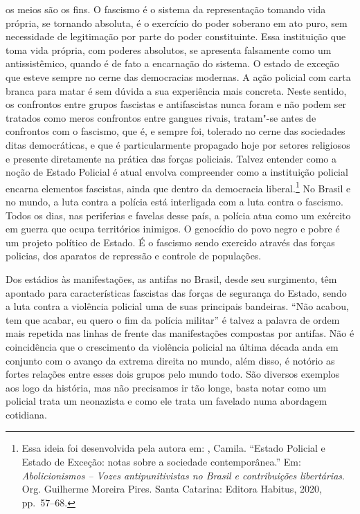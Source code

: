 os meios são os fins. O fascismo é o sistema da representação
tomando vida própria, se tornando absoluta, é o exercício do poder
soberano em ato puro, sem necessidade de legitimação por parte do poder
constituinte. Essa instituição que toma vida própria, com poderes
absolutos, se apresenta falsamente como um antissistêmico, quando é de
fato a encarnação do sistema. O estado de exceção que esteve sempre no
cerne das democracias modernas. A ação policial com carta branca para
matar é sem dúvida a sua experiência mais concreta. Neste sentido, os
confrontos entre grupos fascistas e antifascistas nunca foram e não podem
ser tratados como meros confrontos entre gangues rivais, tratam"-se antes
de confrontos com o fascismo, que é, e sempre foi, tolerado no cerne das
sociedades ditas democráticas, e que é particularmente propagado hoje
por setores religiosos e presente diretamente na prática das forças
policiais. Talvez entender como a noção de Estado Policial é atual
envolva compreender como a instituição policial encarna elementos
fascistas, ainda que dentro da democracia liberal.\footnote{Essa ideia
  foi desenvolvida pela autora em: , Camila. ``Estado Policial e
  Estado de Exceção: notas sobre a sociedade contemporânea.'' Em:
  \emph{Abolicionismos -- Vozes antipunitivistas no Brasil e
  contribuições libertárias}. Org. Guilherme Moreira Pires.
  Santa Catarina: Editora Habitus, 2020, pp.~57--68.} No Brasil e no mundo, a luta contra
a polícia está interligada com a luta contra o fascismo. Todos os dias,
nas periferias e favelas desse país, a polícia atua como um exército em
guerra que ocupa territórios inimigos. O genocídio do povo negro e pobre
é um projeto político de Estado. É o fascismo sendo exercido através das
forças policias, dos aparatos de repressão e controle de populações.

Dos estádios às manifestações, as antifas no Brasil, desde seu
surgimento, têm apontado para características fascistas das forças de
segurança do Estado, sendo a luta contra a violência policial uma de suas principais bandeiras. ``Não acabou, tem que acabar, eu
quero o fim da polícia militar'' é talvez a palavra de ordem mais repetida
nas linhas de frente das manifestações compostas por antifas. Não
é coincidência que o crescimento da violência policial na última década
anda em conjunto com o avanço da extrema direita no mundo, além disso, é
notório as fortes relações entre esses dois grupos pelo mundo todo. São
diversos exemplos aos logo da história, mas não precisamos ir tão longe,
basta notar como um policial trata um neonazista e como ele trata um
favelado numa abordagem cotidiana.

